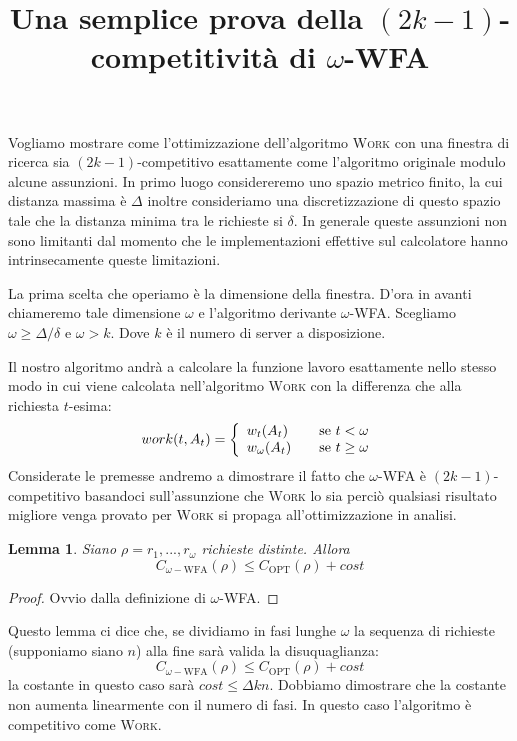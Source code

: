 \documentclass[a4paper, 11pt]{article}
\begin{document}
\title{Una semplice prova della $(2k - 1)$-competitività di $\omega$-WFA}
\maketitle

Vogliamo mostrare come l'ottimizzazione dell'algoritmo \textsc{Work} con una 
finestra di ricerca sia $(2k - 1)$-competitivo esattamente come l'algoritmo 
originale modulo alcune assunzioni. In primo luogo considereremo uno spazio
metrico finito, la cui distanza massima è $\Delta$ inoltre consideriamo una
discretizzazione di questo spazio tale che la distanza minima tra le richieste
si $\delta$. In generale queste assunzioni non sono limitanti dal momento che 
le implementazioni effettive sul calcolatore hanno intrinsecamente queste 
limitazioni.

La prima scelta che operiamo è la dimensione della finestra. D'ora in avanti 
chiameremo tale dimensione $\omega$ e l'algoritmo derivante $\omega$-WFA. 
Scegliamo $\omega \geq \Delta/\delta$ e $\omega > k$. Dove $k$ è il numero di 
server a disposizione. 

Il nostro algoritmo andrà a calcolare la funzione lavoro esattamente nello 
stesso modo in cui viene calcolata nell'algoritmo \textsc{Work} con la 
differenza che alla richiesta $t$-esima:
\[
    work(t, A_t) = 
    \left\{ \begin{array}{l l}
        w_t(A_t) & \quad \text{se } t < \omega\\
        w_\omega(A_t) & \quad \text{se } t \geq \omega \\
    \end{array}\right.
\]
Considerate le premesse andremo a dimostrare il fatto che $\omega$-WFA è 
$(2k - 1)$-competitivo basandoci sull'assunzione che \textsc{Work} lo sia
perciò qualsiasi risultato migliore venga provato per \textsc{Work} si propaga
all'ottimizzazione in analisi.

\newtheorem{reaching}{Lemma}
\begin{reaching}
Siano $\rho = r_1, ..., r_\omega$ richieste distinte. Allora
\[
    C_{\omega-\text{WFA}}(\rho) \leq C_{\text{OPT}}(\rho) + cost
\]
\end{reaching}
\begin{proof}
Ovvio dalla definizione di $\omega$-WFA.
\end{proof}
Questo lemma ci dice che, se dividiamo in fasi lunghe $\omega$ la sequenza di 
richieste (supponiamo siano $n$) alla fine sarà valida la disuquaglianza:
\[
    C_{\omega-\text{WFA}}(\rho) \leq C_{\text{OPT}}(\rho) + cost 
\]
la costante in questo caso sarà $cost \leq \Delta k n$. Dobbiamo dimostrare che 
la costante non aumenta linearmente con il numero di fasi. In questo caso 
l'algoritmo è competitivo come \textsc{Work}.
\end{document}
